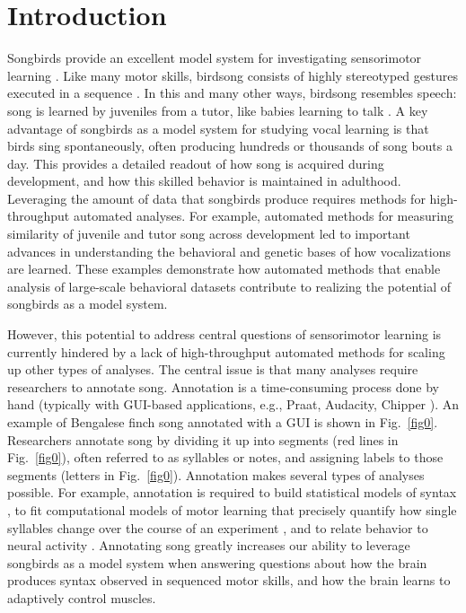 \documentclass[10pt,letterpaper]{article}
\begin{document}
\section*{Introduction}
\label{intro}
Songbirds provide an excellent model system for investigating sensorimotor learning \cite{mooney_neurobiology_2009}. 
Like many motor skills, 
birdsong consists of highly stereotyped gestures executed in a sequence \cite{fee_songbird_2010}.
In this and many other ways, birdsong resembles speech: 
 song is learned by juveniles from a tutor, like babies learning to talk \cite{brainard_what_2002}.
A key advantage of songbirds as a model system for studying vocal learning is that birds sing spontaneously, 
often producing hundreds or thousands of song bouts a day.
This provides a detailed readout of how song is acquired during development, 
and how this skilled behavior is maintained in adulthood.
Leveraging the amount of data that songbirds produce requires 
methods for high-throughput automated analyses.
For example, automated methods for measuring similarity of juvenile and tutor song 
across development \cite{tchernichovski_procedure_2000,mets_automated_2018}
led to important advances in understanding the behavioral 
\cite{tchernichovski_dynamics_2001,mets_learning_2019}
and genetic \cite{mets_genetic_2018} bases of how vocalizations are learned.
These examples demonstrate how automated methods that enable analysis of 
large-scale behavioral datasets 
contribute to realizing the potential of songbirds as a model system.

However, this potential to address central questions of sensorimotor learning 
is currently hindered by a lack of high-throughput automated methods  
for scaling up other types of analyses.
The central issue is that many analyses require researchers to annotate song.
Annotation is a time-consuming process done by hand 
(typically with GUI-based applications, e.g., Praat, Audacity, Chipper  \cite{noauthor_praat_nodate,noauthor_audacity_nodate, searfoss2020chipper}).
An example of Bengalese finch song annotated with a GUI is shown in Fig.~\ref{fig0}.
Researchers annotate song by dividing it up into segments (red lines in Fig.~\ref{fig0}), 
often referred to as syllables or notes, 
and assigning labels to those segments (letters in Fig.~\ref{fig0}).
Annotation makes several types of analyses possible. 
For example, annotation is required to build statistical models of syntax
\cite{markowitz_long-range_2013,jin2011compact,berwick2011songs,hedley2016complexity},
to fit computational models of motor learning that 
precisely quantify how single syllables change over the course of an experiment
\cite{sober2009adult,sober2012vocal}, 
and to relate behavior to neural activity 
\cite{wohlgemuth_linked_2010,aronov_specialized_2008,hahnloser_ultra-sparse_2002}.
Annotating song greatly increases our ability to leverage songbirds as a model system 
when answering questions about how the brain produces syntax observed in 
sequenced motor skills, and how the brain learns to adaptively control muscles.
\end{document}
